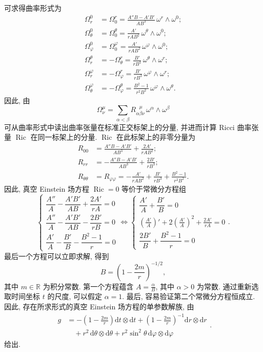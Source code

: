 可求得曲率形式为
\begin{align*}
  \Omega_r^0&=\Omega_0^r
    =\frac{A''B-A'B'}{AB^3}\,\omega^r\wedge\omega^0;\\
  \Omega_\theta^0&=\Omega_0^\theta
    =\frac{A'}{rAB^2}\,\omega^\theta\wedge\omega^0;\\
  \Omega_\varphi^0&=\Omega_0^\varphi
    =\frac{A'}{rAB^2}\,\omega^\varphi\wedge\omega^0;\\
  \Omega_r^\theta&=-\Omega_\theta^r
    =\frac{B'}{rB^3}\,\omega^\theta\wedge\omega^r;\\
  \Omega_r^\varphi&=-\Omega_\varphi^r
    =\frac{B'}{rB^3}\,\omega^\varphi\wedge\omega^r;\\
  \Omega_\theta^\varphi&=-\Omega_\varphi^\theta
    =\frac{B^2-1}{r^2B^2}\,\omega^\varphi\wedge\omega^\theta.
\end{align*}
因此, 由
\[
  \Omega_\nu^\mu=\sum_{\alpha<\beta}R_{\alpha\beta\nu}^{\ \ \ \mu}\,
                             \omega^\alpha\wedge\omega^\beta
\]
可从曲率形式中读出曲率张量在标准正交标架上的分量, 并进而计算 Ricci 曲率张量 $\operatorname{Ric}$ 在同一标架上的分量. $\operatorname{Ric}$ 在此标架上的非零分量为
\begin{align*}
  R_{00}&=\frac{A''B-A'B'}{AB^3}+\frac{2A'}{rAB^2};\\
  R_{rr}&=-\frac{A''B-A'B'}{AB^3}+\frac{2B'}{rB^3};\\
  R_{\theta\theta}&=R_{\varphi\varphi}
    =-\frac{A'}{rAB^2}+\frac{B'}{rB^3}+\frac{B^2-1}{r^2B^2}.
\end{align*}
因此, 真空 Einstein 场方程 $\operatorname{Ric}=0$ 等价于常微分方程组
\[
  \begin{cases}
    \dfrac{A''}{A}-\dfrac{A'B'}{AB}+\dfrac{2A'}{rA}=0\\[.7ex]
    \dfrac{A''}{A}-\dfrac{A'B'}{AB}-\dfrac{2B'}{rB}=0\\[.7ex]
    \dfrac{A'}{A}-\dfrac{B'}{B}-\dfrac{B^2-1}{r}=0
  \end{cases}
  \iff
  \begin{cases}
    \dfrac{A'}{A}+\dfrac{B'}{B}=0\\[.7ex]
    \displaystyle\left(\frac{A'}{A}\right)'+2\left(\frac{A'}{A}\right)^2
     +\frac{2A'}{rA}=0\\[.7ex]
    \dfrac{2B'}{B}+\dfrac{B^2-1}{r}=0
  \end{cases}.
\]
最后一个方程可以立即求解, 得到
\[
  B=\left(1-\frac{2m}{r}\right)^{-1/2},
\]
其中 $m\in\mathbb{R}$ 为积分常数. 第一个方程蕴含 $A=\frac{\alpha}{B}$, 其中 $\alpha>0$ 为常数. 通过重新选取时间坐标 $t$ 的尺度, 可以假定 $\alpha=1$. 最后, 容易验证第二个常微分方程恒成立. 因此, 存在所求形式的真空 Einstein 场方程的单参数解族, 由
\begin{equation}\label{eq:schwarzschild-metric}
  \begin{aligned}
    g&=-\left(1-\frac{2m}{r}\right)\mathrm{d}t\otimes\mathrm{d}t
       +\left(1-\frac{2m}{r}\right)^{-1}\mathrm{d}r\otimes\mathrm{d}r\\
     &\quad+r^2\,\mathrm{d}\theta\otimes\mathrm{d}\theta
       +r^2\sin^2\theta\,\mathrm{d}\varphi\otimes\mathrm{d}\varphi
  \end{aligned}.
\end{equation}
给出.

